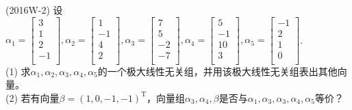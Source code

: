 \documentclass[lang=cn,newtx,10pt,scheme=chinese]{elegantbook}
\begin{document}
\begin{exercise}
    (2016W-2) 设$\alpha_1=
    \left[
    \begin{matrix}
        3 \\
        1 \\
        2 \\
        -1 \\
    \end{matrix}
    \right],\alpha_2=
    \left[
    \begin{matrix}
        1 \\
        -1 \\
        4 \\
        2 \\
    \end{matrix}
    \right],\alpha_3=
    \left[
    \begin{matrix}
        7 \\
        5 \\
        -2 \\
        -7 \\
    \end{matrix}
    \right],\alpha_4=
    \left[
    \begin{matrix}
        5 \\
        -1 \\
        10 \\
        3 \\
    \end{matrix}
    \right],\alpha_5=
    \left[
    \begin{matrix}
        -1 \\
        2 \\
        1 \\
        0 \\
    \end{matrix}
    \right]
    $. \\
    (1) 求$\alpha_1,\alpha_2,\alpha_3,\alpha_4,\alpha_5$的一个极大线性无关组，并用该极大线性无关组表出其他向量。\\
    (2) 若有向量$\beta = (1,0,-1,-1)^\mathrm{T}$，向量组$\alpha_3,\alpha_4,\beta$是否与$\alpha_1,\alpha_3,\alpha_3,\alpha_4,\alpha_5$等价？
\end{exercise}
\end{document}
